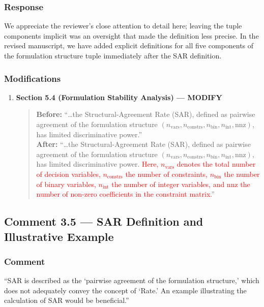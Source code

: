 \documentclass[11pt,a4paper]{article}
\begin{document}
\subsubsection{Response}
We appreciate the reviewer's close attention to detail here; leaving the tuple components implicit was an oversight that made the definition less precise. In the revised manuscript, we have added explicit definitions for all five components of the formulation structure tuple immediately after the SAR definition.

\subsubsection{Modifications}
\begin{enumerate}
\item \textbf{Section 5.4 (Formulation Stability Analysis) --- MODIFY}
\begin{quote}
\textbf{Before:} ``\ldots the Structural-Agreement Rate (SAR), defined as pairwise agreement of the formulation structure $(n_{\text{vars}}, n_{\text{constrs}}, n_{\text{bin}}, n_{\text{int}}, \text{nnz})$, has limited discriminative power.''\\[4pt]
\textbf{After:} ``\ldots the Structural-Agreement Rate (SAR), defined as pairwise agreement of the formulation structure $(n_{\text{vars}}, n_{\text{constrs}}, n_{\text{bin}}, n_{\text{int}}, \text{nnz})$, has limited discriminative power. \textcolor{red}{Here, $n_{\text{vars}}$ denotes the total number of decision variables, $n_{\text{constrs}}$ the number of constraints, $n_{\text{bin}}$ the number of binary variables, $n_{\text{int}}$ the number of integer variables, and nnz the number of non-zero coefficients in the constraint matrix.}''
\end{quote}
\end{enumerate}

\subsection{Comment 3.5 --- SAR Definition and Illustrative Example}

\subsubsection{Comment}
``SAR is described as the `pairwise agreement of the formulation structure,' which does not adequately convey the concept of `Rate.' An example illustrating the calculation of SAR would be beneficial.''
\end{document}
